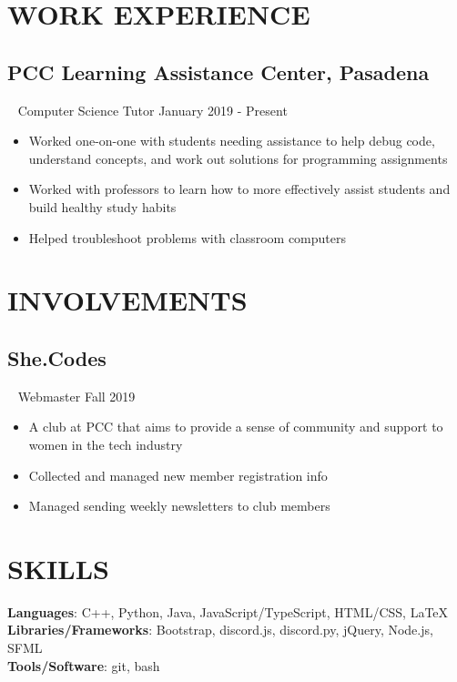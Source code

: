 \documentclass{article}
\newcommand{\resumesection}[3]{
    \subsection*{#1}
    \ 
    \footnotesize
    \textcolor{wordgrey}{#2}
    \normalsize
    \hfill
    \textcolor{wordgrey}{#3}
}
\begin{document}
\section*{\textcolor{wordblue}{WORK EXPERIENCE}}
\resumesection{PCC Learning Assistance Center, Pasadena}{Computer Science Tutor}{January 2019 - Present}
\begin{itemize}
    \item Worked one-on-one with students needing assistance to help debug code, understand concepts, and work out solutions for programming assignments
    \item Worked with professors to learn how to more effectively assist students and build healthy study habits
    \item Helped troubleshoot problems with classroom computers
\end{itemize}


\section*{\textcolor{wordblue}{INVOLVEMENTS}}
\resumesection{She.Codes}{Webmaster}{Fall 2019}
\begin{itemize}
    \item A club at PCC that aims to provide a sense of community and support to women in the tech industry
    \item Collected and managed new member registration info
    \item Managed sending weekly newsletters to club members    
\end{itemize}


\section*{\textcolor{wordblue}{SKILLS}}
\textbf{Languages}: C++, Python, Java, JavaScript/TypeScript, HTML/CSS, {\selectfont\LaTeX}\\
\textbf{Libraries/Frameworks}: Bootstrap, discord.js, discord.py, jQuery, Node.js, SFML\\
\textbf{Tools/Software}: git, bash
\end{document}
